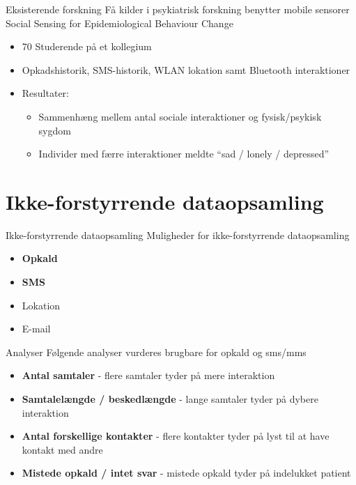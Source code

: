 { %
	\begin{frame}{Eksisterende forskning} %
		Få kilder i psykiatrisk forskning benytter mobile sensorer
		Social Sensing for Epidemiological Behaviour Change
		\begin{itemize}
			\item 70 Studerende på et kollegium
			\item Opkadshistorik, SMS-historik, WLAN lokation samt Bluetooth interaktioner
			\item Resultater:
			\begin{itemize}
				\item Sammenhæng mellem antal sociale interaktioner og fysisk/psykisk sygdom
				\item Individer med færre interaktioner meldte ``sad / lonely / depressed''
			\end{itemize}
		\end{itemize}
		
		
	\end{frame}}

\section{Ikke-forstyrrende dataopsamling}
{ %
	\begin{frame}{Ikke-forstyrrende dataopsamling} %
		Muligheder for ikke-forstyrrende dataopsamling
		\begin{itemize}
			\item \textbf{Opkald}
			\item \textbf{SMS}
			\item Lokation
			\item E-mail
		\end{itemize}
			
	\end{frame}}



{ %
\begin{frame}{Analyser} %
Følgende analyser vurderes brugbare for opkald og sms/mms
\begin{itemize}
	\item \textbf{Antal samtaler} - flere samtaler tyder på mere interaktion
	\item \textbf{Samtalelængde / beskedlængde} - lange samtaler tyder på dybere interaktion
	\item \textbf{Antal forskellige kontakter} - flere kontakter tyder på lyst til at have kontakt med andre
	\item \textbf{Mistede opkald / intet svar} - mistede opkald tyder på indelukket patient
\end{itemize}
	
\end{frame}}

